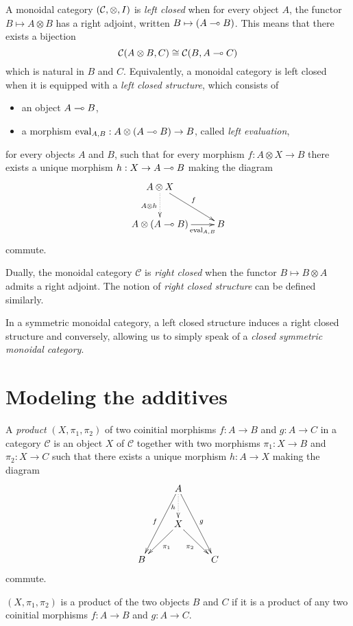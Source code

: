 \begin{definition}\label{smcc}
A monoidal category $(\mathcal{C},\otimes,I)$ is \emph{left closed} when for every object $A$, the functor $B\mapsto A\otimes B$ has a right adjoint, written $B\mapsto(A\multimap B)$.
This means that there exists a bijection
\begin{equation*}
\mathcal{C}(A\otimes B, C) \cong \mathcal{C}(B,A\multimap C)
\end{equation*}
which is natural in $B$ and $C$.
Equivalently, a monoidal category is left closed when it is equipped with a \emph{left closed structure}, which consists of
\begin{itemize}
\item an object $A\multimap B$,
\item a morphism $\mathrm{eval}_{A,B}:A\otimes (A\multimap B)\to B$, called \emph{left evaluation},
\end{itemize}
for every objects $A$ and $B$, such that for every morphism $f:A\otimes X\to B$ there exists a unique morphism $h:X\to A\multimap B$ making the diagram
\begin{equation*}
\xymatrix{
A\tens X\ar@{.>}[d]_{A\tens h}\ar[dr]^{f}\\
A\tens(A\limp B)\ar[r]_-{\mathrm{eval}_{A,B}}& B
}
\end{equation*}
commute.

Dually, the monoidal category $\mathcal{C}$ is \emph{right closed} when the functor $B\mapsto B\otimes A$ admits a right adjoint. The notion of \emph{right closed structure} can be defined similarly.
\end{definition}

In a symmetric monoidal category, a left closed structure induces a
right closed structure and conversely, allowing us to simply speak of a
\emph{closed symmetric monoidal category}.

\section{Modeling the additives}\label{modeling-the-additives}

\begin{definition}[Product]\label{cartesianproduct}
A \emph{product} $(X,\pi_1,\pi_2)$ of two coinitial morphisms $f:A\to B$ and $g:A\to C$ in a category $\mathcal{C}$ is an object $X$ of $\mathcal{C}$ together with two morphisms $\pi_1:X\to B$ and $\pi_2:X\to C$ such that there exists a unique morphism $h:A\to X$ making the diagram
\begin{equation*}
\xymatrix{
& \ar[ddl]_fA\ar@{.>}[d]_h\ar[ddr]^g& \\
& \ar[dl]^{\pi_1}X\ar[dr]_{\pi_2}& \\
B& & C
}
\end{equation*}
commute.

$(X,\pi_1,\pi_2)$ is a product of the two objects $B$ and $C$ if it is a product of any two coinitial morphisms $f:A\to B$ and $g:A\to C$.
\end{definition}

